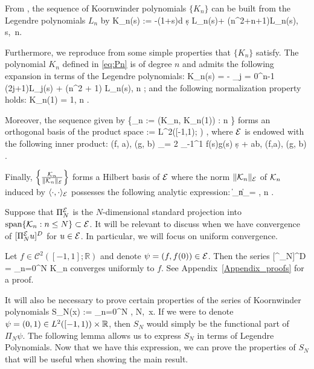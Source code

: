 From \cite[Eq.~(2.1)]{Koornwinder}, the sequence of Koornwinder polynomials \(\{K_n\}\) can be built from the Legendre polynomials \(L_n\) by 
\be\label{eq:Pn}
    K_n(s) := -(1+s)\frac d {\d s} L_n(s)+ (n^2+n+1)L_n(s), \quad s\in[-1,1],\  n\in\Nzero.
\ee

Furthermore, we reproduce from \cite[Prop.~3.1]{CGLW16} some simple properties that \(\{K_n\}\) satisfy.
\bprop\label{prop:koorn_properties}
The polynomial \(K_n\) defined in \eqref{eq:Pn} is of degree \(n\) and  admits the following expansion in terms of the Legendre polynomials:
\be\label{eq:Pn2}
    K_n(s) = - \sum_{j = 0}^{n-1} (2j+1)L_j(s) + (n^2 + 1) L_n(s), \qquad n \in \Nzero;
\ee
and the following normalization property holds:
\be
    K_n(1) = 1, \qquad n \in \Nzero.
\ee

Moreover, the sequence given by
\be
    \{_n := (K_n, K_n(1)) : n \in \Nzero\}
\ee 
forms an orthogonal basis of the  product space 
\be
     := L^2([-1,1); \R) \times  \R,
\ee 
where \(\mathcal E\) is endowed with the following inner product:
\be
    \langle (f, a), (g, b) \rangle_\mcE =  2 \int_{-1}^1 f(s)g(s) \d s  + ab, \quad (f,a), (g, b) \in \mcE.
\ee

Finally, \(\left\{ \frac{\mathcal K_n}{\| \mathcal K_n \|_\mathcal E} \right\}\) forms a Hilbert basis of $\mathcal E$ where 
the norm \(\| \mathcal K_n \|_\mathcal E\) of \(\mathcal K_n\) induced by  \(\langle \cdot, \cdot \rangle_\mathcal E\)  possesses the following analytic expression:
\be \label{eq:Pn_norm}
    \|\mcK_n\|_\mcE = , \qquad n \in \Nzero.
\ee
\eprop

Suppose that \(\Pi^\mathcal E_N\) is the \(N\)-dimensional standard projection into \(\mbox{span}\{\mathcal K_n: n\leq N\} \subset \mathcal E\). It will be relevant to discuss when we have convergence of \([\Pi^\mathcal E_N u]^D\) for \(u\in\mathcal E\). In particular, we will focus on uniform convergence. 

\bprop\label{prop:uniform-conv}
Let \(f\in \mathcal C^2([-1,1];\mathbb R)\) and denote \(\psi = (f, f(0)) \in\mathcal E\). Then the series
\be\label{koorn-series}
    [\Pi^\mcE_N\psi]^D = \sum_{n=0}^N  K_n
\ee
converges uniformly to \(f\).
\eprop
See Appendix~\ref{Appendix_proofs} for a proof.

It will also be necessary to prove certain properties of the series of Koornwinder polynomials
\be\label{eq:SN}
    S_N(x) := \sum_{n=0}^N , \quad N\in\Nzero,\  x\in[-1,1].
\ee
If we were to denote \(\psi = (0,1) \in L^2([-1,1)) \times \mathbb R\), then \(S_N\) would simply be the functional part of \(\Pi_N\psi\). The following lemma allows us to express \(S_N\) in terms of Legendre Polynomials. Now that we have this expression, we can prove the properties of \(S_N\) that will be useful when showing the main result.

